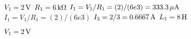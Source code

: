 

\mbox{$V_{1}=\mbox{$2 \,\mathrm{ V}$}$}
\mbox{$R_{1}=\mbox{$6 \,\mathrm{k \Omega}$}$}
\mbox{$I_{1} = V_{1}/R_{1}  =  (2)/(6e3) = \mbox{$333.3 \,\mathrm{\mu A}$}$}
\mbox{$I_{1} = V_{1}/R_{1}  =  (2)/(6e3)$}
\mbox{$I_{3}=2/3  = \mbox{$0.6667 \,\mathrm{ A}$}$}
\mbox{$L_{1}=\mbox{$8 \,\mathrm{ H}$}$}


\mbox{$V_{1}=\mbox{$2 \,\mathrm{ V}$}$}

